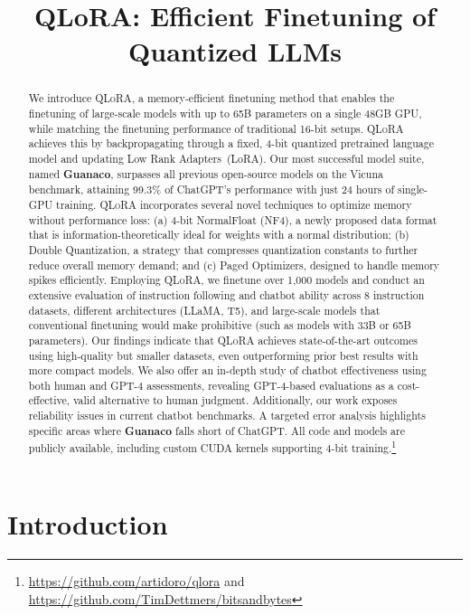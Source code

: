 \title{QLoRA: Efficient Finetuning of Quantized LLMs}

\begin{abstract}
We introduce \textsc{QLoRA}, a memory-efficient finetuning method that enables the finetuning of large-scale models with up to 65B parameters on a single 48GB GPU, while matching the finetuning performance of traditional 16-bit setups. \textsc{QLoRA} achieves this by backpropagating through a fixed, 4-bit quantized pretrained language model and updating Low Rank Adapters~(LoRA). Our most successful model suite, named \textbf{Guanaco}, surpasses all previous open-source models on the Vicuna benchmark, attaining 99.3\% of ChatGPT's performance with just 24 hours of single-GPU training. \textsc{QLoRA} incorporates several novel techniques to optimize memory without performance loss: (a) 4-bit NormalFloat (NF4), a newly proposed data format that is information-theoretically ideal for weights with a normal distribution; (b) Double Quantization, a strategy that compresses quantization constants to further reduce overall memory demand; and (c) Paged Optimizers, designed to handle memory spikes efficiently. Employing \textsc{QLoRA}, we finetune over 1,000 models and conduct an extensive evaluation of instruction following and chatbot ability across 8 instruction datasets, different architectures (LLaMA, T5), and large-scale models that conventional finetuning would make prohibitive (such as models with 33B or 65B parameters). Our findings indicate that \textsc{QLoRA} achieves state-of-the-art outcomes using high-quality but smaller datasets, even outperforming prior best results with more compact models. We also offer an in-depth study of chatbot effectiveness using both human and GPT-4 assessments, revealing GPT-4-based evaluations as a cost-effective, valid alternative to human judgment. Additionally, our work exposes reliability issues in current chatbot benchmarks. A targeted error analysis highlights specific areas where \textbf{Guanaco} falls short of ChatGPT. All code and models are publicly available, including custom CUDA kernels supporting 4-bit training.\footnote{\url{https://github.com/artidoro/qlora} and \url{https://github.com/TimDettmers/bitsandbytes}}
\end{abstract}

\section{Introduction}

